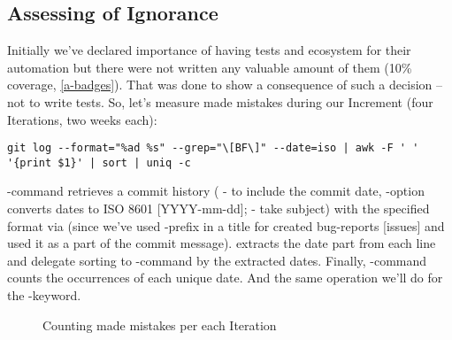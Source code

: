
\newpage
\subsection{Assessing of Ignorance} \label{ut-fail}

Initially we've declared importance of having tests and ecosystem for their automation but there were not written any 
valuable amount of them (10\% coverage, \ref{a-badges}). That was done to show a consequence of such a decision -- not 
to write tests. So, let's measure made mistakes during our Increment (four Iterations, two weeks each):

\begin{lstlisting}[language=terminal]
git log --format="%ad %s" --grep="\[BF\]" --date=iso | awk -F ' ' '{print $1}' | sort | uniq -c
\end{lstlisting}

\noindent {}-command retrieves a commit history ( - to include the commit date, -option 
converts dates to ISO 8601 [YYYY-mm-dd];  - take subject) with the specified format via  (since we've 
used \q{[BF]}-prefix in a title for created bug-reports [issues] and used it as a part of the commit message).  
extracts the date part from each line and delegate sorting to -command by the extracted dates. Finally, 
-command counts the occurrences of each unique date. And the same operation we'll do for the -keyword.

\begin{figure}[h]
  \begin{center}
  \end{center}
  \caption{Counting made mistakes per each Iteration}\label{graph:errors}
\end{figure}

